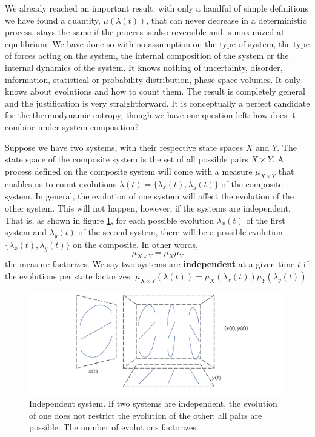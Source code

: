 \documentclass[letterpaper,twocolumn]{article}
\begin{document}
We already reached an important result: with only a handful of simple definitions we have found a quantity, $\mu(\lambda(t))$, that can never decrease in a deterministic process, stays the same if the process is also reversible and is maximized at equilibrium. We have done so with no assumption on the type of system, the type of forces acting on the system, the internal composition of the system or the internal dynamics of the system. It knows nothing of uncertainty, disorder, information, statistical or probability distribution, phase space volumes. It only knows about evolutions and how to count them. The result is completely general and the justification is very straightforward. It is conceptually a perfect candidate for the thermodynamic entropy, though we have one question left: how does it combine under system composition?

Suppose we have two systems, with their respective state spaces $X$ and $Y$. The state space of the composite system is the set of all possible pairs $X \times Y$. A process defined on the composite system will come with a measure $\mu_{X \times Y}$ that enables us to count evolutions $\lambda(t) = \{\lambda_x(t), \lambda_y(t)\}$ of the composite system. In general, the evolution of one system will affect the evolution of the other system. This will not happen, however, if the systems are independent. That is, as shown in figure \ref{fig_independence}, for each possible evolution $\lambda_x(t)$ of the first system and $\lambda_y(t)$ of the second system, there will be a possible evolution $\{\lambda_x(t), \lambda_y(t)\}$ on the composite. In other words,
\begin{equation}
	\mu_{X \times Y} = \mu_X \mu_Y
\end{equation}
the measure factorizes. We say two systems are \textbf{independent} at a given time $t$ if the evolutions per state factorizes: $\mu_{X \times Y}(\lambda(t)) = \mu_X (\lambda_x(t)) \mu_Y (\lambda_y(t))$.

\begin{figure}[h]
	\includegraphics[width=\columnwidth]{images/Slide7.png}
	\caption{Independent system. If two systems are independent, the evolution of one does not restrict the evolution of the other: all pairs are possible. The number of evolutions factorizes.}\label{fig_independence}
\end{figure}
\end{document}
